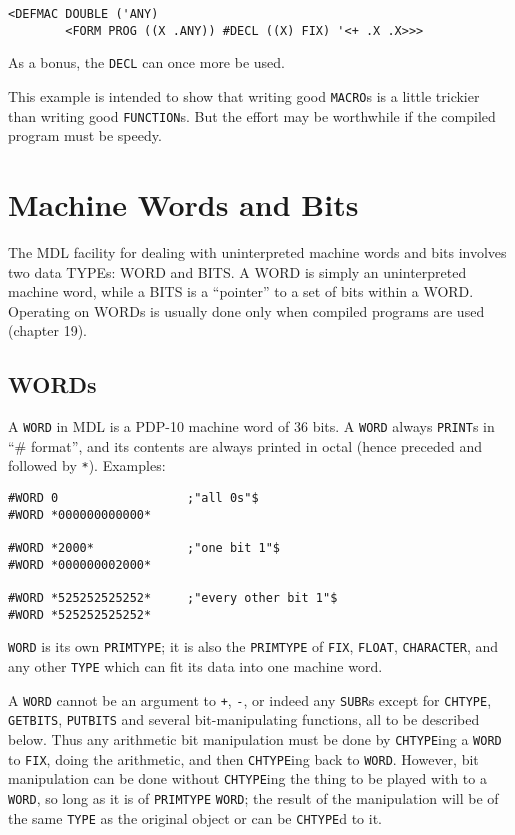 \documentclass[a4paper]{scrbook}
\begin{document}
\begin{verbatim}
<DEFMAC DOUBLE ('ANY)
        <FORM PROG ((X .ANY)) #DECL ((X) FIX) '<+ .X .X>>>
\end{verbatim}

As a bonus, the \texttt{DECL} can once more be used.

This example is intended to show that writing good \texttt{MACRO}s is a little trickier than writing good
\texttt{FUNCTION}s. But the effort may be worthwhile if the compiled program must be speedy.

\chapter{Machine Words and Bits}\label{chapter-18.-machine-words-and-bits}

The MDL facility for dealing with uninterpreted machine words and bits involves two data TYPEs: WORD and BITS. A WORD is
simply an uninterpreted machine word, while a BITS is a ``pointer'' to a set of bits within a WORD. Operating on WORDs is
usually done only when compiled programs are used (chapter 19).

\section{WORDs}\label{words}

A \texttt{WORD} in MDL is a PDP-10 machine word of 36 bits. A \texttt{WORD} always \texttt{PRINT}s in ``\# format'', and
its contents are always printed in octal (hence preceded and followed by \texttt{*}\index{\texttt{*}}). Examples:

\begin{verbatim}
#WORD 0                  ;"all 0s"$
#WORD *000000000000*

#WORD *2000*             ;"one bit 1"$
#WORD *000000002000*

#WORD *525252525252*     ;"every other bit 1"$
#WORD *525252525252*
\end{verbatim}

\texttt{WORD} is its own \texttt{PRIMTYPE}; it is also the \texttt{PRIMTYPE} of \texttt{FIX}, \texttt{FLOAT},
\texttt{CHARACTER}, and any other \texttt{TYPE} which can fit its data into one machine word.

A \texttt{WORD} cannot be an argument to \texttt{+}, \texttt{-}, or indeed any \texttt{SUBR}s except for \texttt{CHTYPE},
\texttt{GETBITS}, \texttt{PUTBITS} and several bit-manipulating functions, all to be described below. Thus any arithmetic
bit manipulation must be done by \texttt{CHTYPE}ing a \texttt{WORD} to \texttt{FIX}, doing the arithmetic, and then
\texttt{CHTYPE}ing back to \texttt{WORD}. However, bit manipulation can be done without \texttt{CHTYPE}ing the thing to be
played with to a \texttt{WORD}, so long as it is of \texttt{PRIMTYPE} \texttt{WORD}; the result of the manipulation will be
of the same \texttt{TYPE} as the original object or can be \texttt{CHTYPE}d to it.
\end{document}
